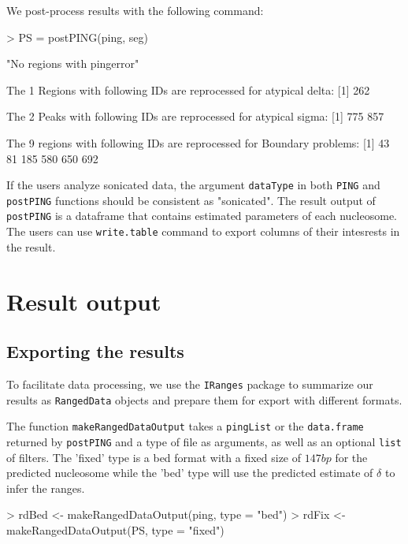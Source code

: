 \documentclass[11pt]{article}
\begin{document}
We post-process results with the following command:


\begin{Schunk}
\begin{Sinput}
> PS = postPING(ping, seg)
\end{Sinput}
\begin{Soutput}
[1] "No regions with pingerror"

 The 1 Regions with following IDs are reprocessed for atypical delta: 
[1] 262

 The 2 Peaks with following IDs are reprocessed for atypical sigma: 
[1] 775 857

 The 9 regions with following IDs are reprocessed for Boundary problems: 
[1]  43  81 185 580 650 692
\end{Soutput}
\end{Schunk}
If the users analyze sonicated data, the argument \texttt{dataType} in both \texttt{PING} and \texttt{postPING} functions should be consistent as "sonicated".
The result output of \texttt{postPING} is a dataframe that contains estimated parameters of each nucleosome. The users can use \texttt{write.table} command to export columns of their intesrests in the result. 



\section{Result output}

\subsection{Exporting the results}
To facilitate data processing, we use the \texttt{IRanges} package to summarize our results as \texttt{RangedData} objects and prepare them for export with different formats.


The function \texttt{makeRangedDataOutput} takes a \texttt{pingList} or the \texttt{data.frame} returned by \texttt{postPING} and a type of file as arguments, as well as an optional \texttt{list} of filters. The 'fixed' type is a bed format with a fixed size of $147bp$ for the predicted nucleosome while the 'bed' type will use the predicted estimate of $\delta$ to infer the ranges.
\begin{Schunk}
\begin{Sinput}
> rdBed <- makeRangedDataOutput(ping, type = "bed")
> rdFix <- makeRangedDataOutput(PS, type = "fixed")
\end{Sinput}
\end{Schunk}
\end{document}
